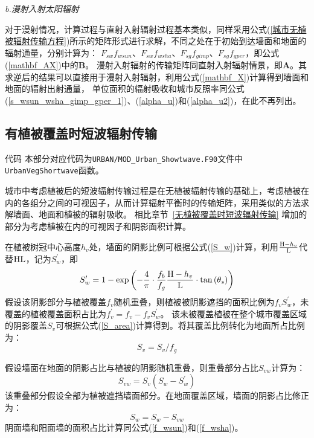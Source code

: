\textit{b.漫射入射太阳辐射}

对于漫射情况，计算过程与直射入射辐射过程基本类似，同样采用公式(\ref{城市无植被辐射传输方程})所示的矩阵形式进行求解，不同之处在于初始到达墙面和地面的辐射通量，分别计算为：
$F_{sw}f_{wsun}$、$F_{sw}f_{wsha}$、$F_{sg}f_{gimp}$、$F_{sg}f_{gper}$，即公式(\ref{mathbf_AX})中的$\mathbf{B}$。
漫射入射辐射的传输矩阵同直射入射辐射情景，即$\mathbf{A}$。其求逆后的结果可以直接用于漫射入射辐射，利用公式(\ref{mathbf_X})计算得到墙面和地面的辐射出射通量，
单位面积的辐射吸收和城市反照率同公式(\ref{s_wsun_wsha_gimp_gper_1})、(\ref{alpha_u})和(\ref{alpha_u2})，在此不再列出。

\subsection{有植被覆盖时短波辐射传输}\label{有植被覆盖时短波辐射传输}
\begin{mymdframed}{代码}
本部分对应代码为\texttt{URBAN/MOD\_Urban\_Showtwave.F90}文件中\texttt{UrbanVegShortwave}函数。
\end{mymdframed}

城市中考虑植被后的短波辐射传输过程是在无植被辐射传输的基础上，考虑植被在内的各组分之间的可视因子，从而计算辐射平衡时的传输矩阵，采用类似的方法求解墙面、地面和植被的辐射吸收。
相比章节~\ref{无植被覆盖时短波辐射传输} 增加的部分为考虑植被在内的可视因子和阴影面积计算。

在植被树冠中心高度$h_v$处，墙面的阴影比例可根据公式(\ref{S_w})计算，利用$\frac{{\rm H}-h_v}{\rm L}$代替$\rm HL$，记为$S_w^\prime$，即
\begin{equation}
S_{w}^{\prime}=1-\exp \left(-\frac{4}{\pi} \cdot \frac{f_{b}}{f_{g}} \frac{{\rm H}-h_{v}}{\rm L} \cdot \tan \left(\theta_{s}\right)\right)
\end{equation}
假设该阴影部分与植被覆盖$f_v$随机重叠，则植被被阴影遮挡的面积比例为$f_vS_w^\prime$，未覆盖的植被覆盖面积占比为$f_v^\prime=f_v-f_vS_w^\prime$。
该未被覆盖植被在整个城市覆盖区域的阴影覆盖$S_v$可根据公式(\ref{S_area})计算得到。将其覆盖比例转化为地面所占比例为：
\begin{equation}\label{S_v2}
S_{v}=S_{v} / f_{g}
\end{equation}

假设墙面在地面的阴影占比与植被的阴影随机重叠，则重叠部分占比$S_{vw}$计算为：
\begin{equation}
S_{v w}=S_{v}\left(S_{w}-S_{w}^{\prime}\right)
\end{equation}
该重叠部分假设全部为植被遮挡墙面部分。在地面覆盖区域，墙面的阴影占比修正为：
\begin{equation}\label{S_w2}
S_{w}=S_{w}-S_{v w}
\end{equation}
阴面墙和阳面墙的面积占比计算同公式(\ref{f_wsun})和(\ref{f_wsha})。

